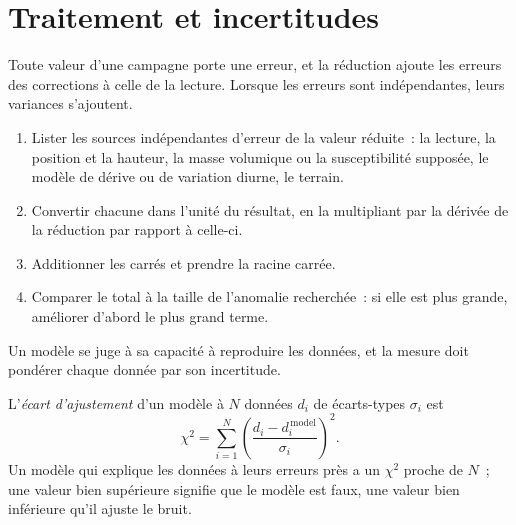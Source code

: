 
\section{Traitement et incertitudes}\label{sec:b3:field-lab-methods-3:processing}

Toute valeur d'une campagne porte une erreur, et la réduction ajoute
les erreurs des corrections à celle de la lecture. Lorsque les erreurs sont
indépendantes, leurs variances s'ajoutent.

\begin{method}\label{met:b3:field-lab-methods-3:budget}
\begin{enumerate}
  \item Lister les sources indépendantes d'erreur de la valeur réduite~: la
        lecture, la position et la hauteur, la masse volumique ou la susceptibilité
        supposée, le modèle de dérive ou de variation diurne, le terrain.
  \item Convertir chacune dans l'unité du résultat, en la multipliant par la
        dérivée de la réduction par rapport à celle-ci.
  \item Additionner les carrés et prendre la racine carrée.
  \item Comparer le total à la taille de l'anomalie recherchée~: si elle est
        plus grande, améliorer d'abord le plus grand terme.
\end{enumerate}
\end{method}

Un modèle se juge à sa capacité à reproduire les données, et la mesure
doit pondérer chaque donnée par son incertitude.

\begin{definition}\label{def:b3:field-lab-methods-3:inversion-practice}
L'\emph{écart d'ajustement} d'un modèle à $N$ données $d_i$ de
écarts-types $\sigma_i$ est
\[
\chi^2 = \sum_{i=1}^N\left(\frac{d_i - d_i^{\,\mathrm{model}}}{\sigma_i}\right)^2 .
\]
Un modèle qui explique les données à leurs erreurs près a un $\chi^2$ proche
de $N$~; une valeur bien supérieure signifie que le modèle est faux, une valeur bien inférieure
qu'il ajuste le bruit.
\end{definition}

